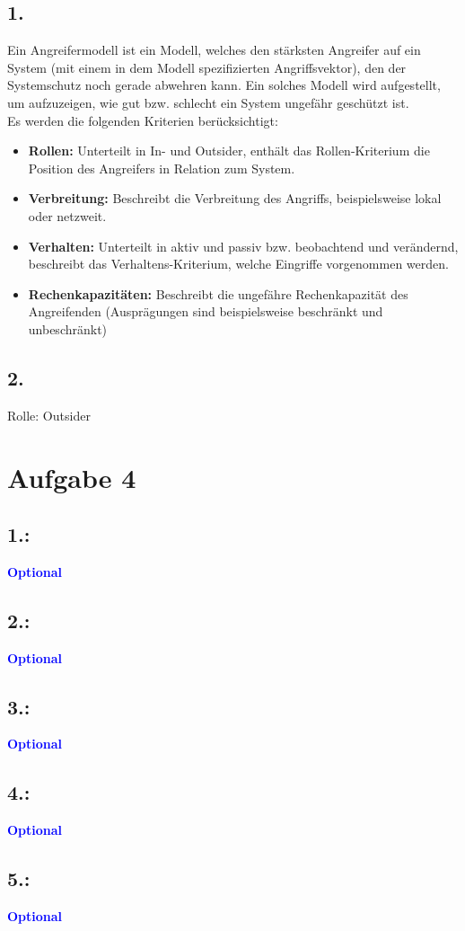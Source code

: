 \documentclass[a4paper,11pt]{scrartcl}
\newcommand{\opt}{\textcolor{blue}{\textbf{Optional}}}
\begin{document}
\subsection*{1.}
Ein Angreifermodell ist ein Modell, welches den stärksten Angreifer auf ein System (mit einem in dem 
Modell spezifizierten Angriffsvektor), den der Systemschutz noch gerade abwehren kann. Ein solches Modell 
wird aufgestellt, um aufzuzeigen, wie gut bzw. schlecht ein System ungefähr geschützt ist. \\
Es werden die folgenden Kriterien berücksichtigt:
\begin{itemize}
  \item \textbf{Rollen:} 
  Unterteilt in In- und Outsider, enthält das Rollen-Kriterium die Position des Angreifers in Relation zum
  System.
  \item \textbf{Verbreitung:} 
  Beschreibt die Verbreitung des Angriffs, beispielsweise lokal oder netzweit.
  \item \textbf{Verhalten:} 
  Unterteilt in aktiv und passiv bzw. beobachtend und verändernd, beschreibt das Verhaltens-Kriterium, welche Eingriffe vorgenommen werden.
  \item \textbf{Rechenkapazitäten:} 
  Beschreibt die ungefähre Rechenkapazität des Angreifenden (Ausprägungen sind beispielsweise beschränkt 
  und unbeschränkt)
\end{itemize}       

\subsection*{2.}
Rolle: Outsider



\section*{Aufgabe 4}
\subsection*{1.:}

\opt
\subsection*{2.:}
\opt
\subsection*{3.:}
\opt
\subsection*{4.:}
\opt
\subsection*{5.:}
\opt
\end{document}
